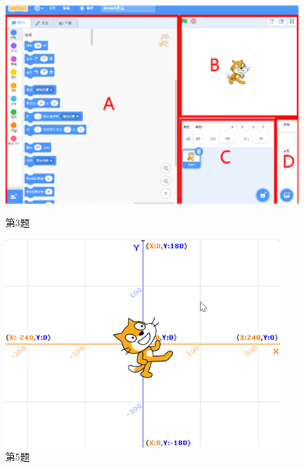 \documentclass[10pt, a4paper]{article}
\begin{document}
\begin{enumerate}
        \begin{figure}[htbp]
            \centering
            \begin{minipage}[t]{.2\textwidth}
                \centering
                \includegraphics[width=1\textwidth]{3.png}
                \caption*{第3题}
            \end{minipage}
            \begin{minipage}[t]{.18\textwidth}
                \centering
                \includegraphics[width=\textwidth]{5.png}
                \caption*{第5题}
            \end{minipage}
            \begin{minipage}[t]{.2\textwidth}
                \centering

\end{minipage}
\end{figure}
\end{enumerate}
\end{document}
